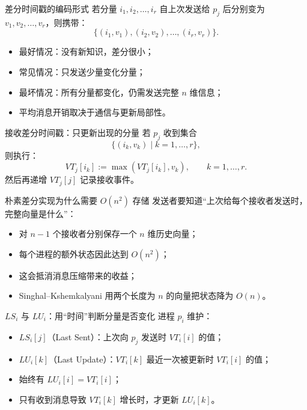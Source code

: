 \documentclass[UTF8,fontset=none,aspectratio=169,10pt]{beamer}
\begin{document}
\begin{frame}{差分时间戳的编码形式}
若分量 $i_1,i_2,\ldots,i_r$ 自上次发送给 $p_j$ 后分别变为 $v_1,v_2,\ldots,v_r$，则携带：
\[
\{(i_1,v_1),(i_2,v_2),\ldots,(i_r,v_r)\}.
\]
\begin{itemize}
  \item 最好情况：没有新知识，差分很小；
  \item 常见情况：只发送少量变化分量；
  \item 最坏情况：所有分量都变化，仍需发送完整 $n$ 维信息；
  \item 平均消息开销取决于通信与更新局部性。
\end{itemize}
\end{frame}

\begin{frame}{接收差分时间戳：只更新出现的分量}
若 $p_j$ 收到集合
\[
\{(i_k,v_k)\mid k=1,\ldots,r\},
\]
则执行：
\[
VT_j[i_k]:=\max(VT_j[i_k],v_k),\qquad k=1,\ldots,r.
\]
然后再递增 $VT_j[j]$ 记录接收事件。
\vfill
{}
\end{frame}

\begin{frame}{朴素差分实现为什么需要 $O(n^2)$ 存储}
发送者要知道“上次给每个接收者发送时，完整向量是什么”：
\begin{itemize}
  \item 对 $n-1$ 个接收者分别保存一个 $n$ 维历史向量；
  \item 每个进程的额外状态因此达到 $O(n^2)$；
  \item 这会抵消消息压缩带来的收益；
  \item Singhal--Kshemkalyani 用两个长度为 $n$ 的向量把状态降为 $O(n)$。
\end{itemize}
\end{frame}

\begin{frame}{$LS_i$ 与 $LU_i$：用“时间”判断分量是否变化}
进程 $p_i$ 维护：
\begin{itemize}
  \item $LS_i[j]$（Last Sent）：上次向 $p_j$ 发送时 $VT_i[i]$ 的值；
  \item $LU_i[k]$（Last Update）：$VT_i[k]$ 最近一次被更新时 $VT_i[i]$ 的值；
  \item 始终有 $LU_i[i]=VT_i[i]$；
  \item 只有收到消息导致 $VT_i[k]$ 增长时，才更新 $LU_i[k]$。
\end{itemize}
\vfill
{}
\end{frame}
\end{document}
